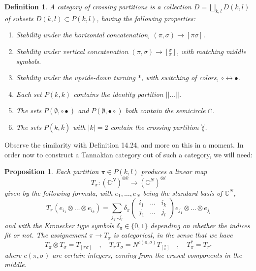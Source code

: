 \documentclass[12pt]{amsbook}
\newtheorem{definition}[theorem]{Definition}
\newtheorem{proposition}[theorem]{Proposition}
\begin{document}
\begin{definition}
A category of crossing partitions is a collection $D=\bigsqcup_{k,l}D(k,l)$ of subsets $D(k,l)\subset P(k,l)$, having the following properties:
\begin{enumerate}
\item Stability under the horizontal concatenation, $(\pi,\sigma)\to[\pi\sigma]$.

\item Stability under vertical concatenation $(\pi,\sigma)\to[^\sigma_\pi]$, with matching middle symbols.

\item Stability under the upside-down turning $*$, with switching of colors, $\circ\leftrightarrow\bullet$.

\item Each set $P(k,k)$ contains the identity partition $||\ldots||$.

\item The sets $P(\emptyset,\circ\bullet)$ and $P(\emptyset,\bullet\circ)$ both contain the semicircle $\cap$.

\item The sets $P(k,\bar{k})$ with $|k|=2$ contain the crossing partition $\slash\hskip-2.0mm\backslash$.
\end{enumerate}
\end{definition} 

Observe the similarity with Definition 14.24, and more on this in a moment. In order now to construct a Tannakian category out of such a category, we will need:

\begin{proposition}
Each partition $\pi\in P(k,l)$ produces a linear map
$$T_\pi:(\mathbb C^N)^{\otimes k}\to(\mathbb C^N)^{\otimes l}$$
given by the following formula, with $e_1,\ldots,e_N$ being the standard basis of $\mathbb C^N$,
$$T_\pi(e_{i_1}\otimes\ldots\otimes e_{i_k})=\sum_{j_1\ldots j_l}\delta_\pi\begin{pmatrix}i_1&\ldots&i_k\\ j_1&\ldots&j_l\end{pmatrix}e_{j_1}\otimes\ldots\otimes e_{j_l}$$
and with the Kronecker type symbols $\delta_\pi\in\{0,1\}$ depending on whether the indices fit or not. The assignement $\pi\to T_\pi$ is categorical, in the sense that we have
$$T_\pi\otimes T_\sigma=T_{[\pi\sigma]}\quad,\quad 
T_\pi T_\sigma=N^{c(\pi,\sigma)}T_{[^\sigma_\pi]}\quad,\quad 
T_\pi^*=T_{\pi^*}$$
where $c(\pi,\sigma)$ are certain integers, coming from the erased components in the middle.
\end{proposition}
\end{document}
